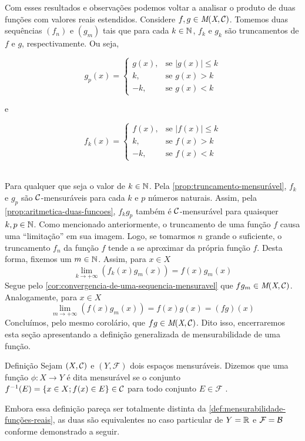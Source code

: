 Com esses resultados e observações podemos voltar a analisar o produto de duas funções com valores reais estendidos.
Considere $f,g \in \operatorname{\textit{M}(\textit{X}, \mathcal{C} )}$. 
Tomemos duas sequências $(f_n)$ e $(g_m)$ tais que para cada $k \in \operatorname{\mathbb{N}}$, $f_k$ e $g_k$ são truncamentos de $f$ e $g$, respectivamente.
Ou seja,
	\hspace{-0.2cm}
	\begin{minipage}{0.5\linewidth}
	$$ g_p(x) =
	\left\{\begin{array}{cc}
		g(x), & \textrm{se\ } |g(x)| \leq k \\
		k, & \textrm{se\ } g(x) > k \\
		-k, & \textrm{se\ } g(x) < k 
	\end{array}\right.	
	$$	
	\end{minipage}
e
	\begin{minipage}{0.5\linewidth}
		$$ f_k(x) =
		\left\{\begin{array}{cc}
			f(x), & \textrm{se\ } |f(x)| \leq k \\
			k, & \textrm{se\ } f(x) > k \\
			-k, & \textrm{se\ } f(x) < k 
		\end{array}\right.	
		$$	
	\end{minipage}
\\

Para qualquer que seja o valor de $k \in \operatorname{\mathbb{N}}$.
Pela \ref{prop:truncamento-mensurável}, $f_k$ e $g_p$ são $\operatorname{\mathcal{C}}$-mensuráveis para cada $k$ e $p$ números naturais.
Assim, pela \ref{prop:aritmetica-duas-funcoes}, $f_kg_p$ também é $\operatorname{\mathcal{C}}$-mensurável para quaisquer $k, p \in \operatorname{\mathbb{N}}$.
Como mencionado anteriormente, o truncamento de uma função $f$ causa uma \enquote{limitação} em sua imagem.
Logo, se tomarmos $n$ grande o suficiente, o truncamento $f_n$ da função $f$ tende a se aproximar da própria função $f$.
Desta forma, fixemos um $m \in \operatorname{\mathbb{N}}$.
Assim, para $x \in X$
$$
\lim_{k \to +\infty} \left(f_k(x)g_m(x)\right) = f(x)g_m(x) 
$$
Segue pelo \ref{cor:convergencia-de-uma-sequencia-mensuravel} que 
$fg_m \in \operatorname{\textit{M}(\textit{X}, \mathcal{C} )}$. 
Analogamente, para $x \in X$
$$
\lim_{m \to +\infty} \left(f(x)g_m(x)\right) 
= f(x)g(x) = (fg)(x)
$$
Concluímos, pelo mesmo corolário, que $fg \in \operatorname{\textit{M}(\textit{X}, \mathcal{C} )}$.
Dito isso, encerraremos esta seção apresentando a definição generalizada de mensurabilidade de uma função.

\begin{env}{Definição}
	\label{def:mensurabilidade-geral}
	Sejam $(X, \operatorname{\mathcal{C}})$ e $(Y,\mathcal{F})$ dois espaços mensuráveis.
	Dizemos que uma função $\phi:X \to Y$ é dita mensurável se o conjunto $f^{-1}(E) = \{x \in X; f(x)\in E\} \in \operatorname{\mathcal{C}}$ para todo conjunto $E \in \mathcal{F}$ \cite{bartle}. 
\end{env}
Embora essa definição pareça ser totalmente distinta da \ref{def:mensurabilidade-funções-reais}, as duas são equivalentes no caso particular de $Y = \mathbb{R}$ e $\mathcal{F} = \operatorname{\mathcal{B}}$ conforme demonstrado a seguir.

